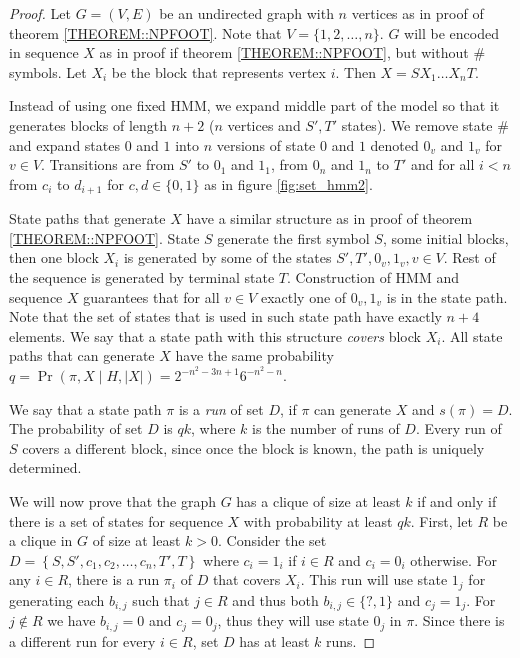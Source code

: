 \begin{proof}
Let $G=(V,E)$ be an undirected graph with $n$ vertices as in proof of theorem
\ref{THEOREM::NPFOOT}. Note that $V = \{1, 2, \dots, n\}$. $G$ will be encoded in
sequence $X$ as in proof if theorem \ref{THEOREM::NPFOOT}, but without $\#$ symbols.
Let $X_i$ be the block that represents vertex $i$. Then $X=SX_1\dots X_nT$.

Instead of using one fixed HMM, we expand middle part of the model so that it
generates blocks of length $n+2$ ($n$ vertices and $S', T'$ states). We remove
state $\#$ and expand states $0$ and $1$ into $n$ versions of state $0$ and $1$
denoted $0_v$ and $1_v$ for $v \in V$.  Transitions are from $S'$ to $0_1$ and
$1_1$, from $0_n$ and $1_n$ to $T'$ and for all $i<n$ from $c_i$ to $d_{i+1}$
for $c,d\in \{0, 1\}$ as in figure  \ref{fig:set_hmm2}. 


State paths that generate $X$ have a similar structure as in proof of theorem
\ref{THEOREM::NPFOOT}. State $S$ generate the first symbol $S$, some initial blocks,
then one block $X_i$ is generated by some of the states $S', T', 0_v, 1_v, v\in
V$.  Rest of the sequence is generated by terminal state $T$.  Construction of
HMM and sequence $X$ guarantees that for all $v\in V$ exactly one of $0_v, 1_v$
is in the state path. Note that the set of states that is used in such state
path have exactly $n+4$ elements. We say that a state path with this structure
\emph{covers} block $X_i$. All state paths that can generate $X$ have the same
probability $q = \Pr(\pi, X\mid H, |X|) = 2^{-n^2-3n+1}6^{-n^2 - n}$.

We say that a state path $\pi$ is a \emph{run} of set $D$, if $\pi$ can generate
$X$ and $s(\pi) = D$. The probability of set $D$ is $qk$, where $k$ is the
number of runs of $D$. Every run of $S$ covers a different block, since once the
block is known, the path is uniquely determined.

We will now prove that the graph $G$ has a clique of size at least $k$ if and
only if there is a set of states for sequence $X$ with probability at least
$qk$.  First, let $R$ be a clique in $G$ of size at least $k>0$.  Consider the
set $D=\left\{S,S',{c_1},{c_2},\dots,{c_n},T',T\right\}$ where $c_i=1_i$ if
$i\in R$ and $c_i=0_i$ otherwise. For any $i\in R$, there is a run $\pi_i$ of
$D$ that covers $X_i$. This run will use state $1_j$ for generating each
$b_{i,j}$ such that $j\in R$ and thus both $b_{i,j}\in \{?,1\}$ and $c_j=1_j$.
For $j\notin R$ we have $b_{i,j}=0$ and $c_j=0_j$, thus they will use state
$0_j$ in $\pi$. Since there is a different run for every $i\in R$, set $D$ has
at least $k$ runs.


\end{proof}
